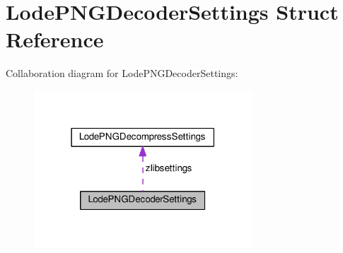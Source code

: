 \hypertarget{struct_lode_p_n_g_decoder_settings}{}\section{Lode\+P\+N\+G\+Decoder\+Settings Struct Reference}
\label{struct_lode_p_n_g_decoder_settings}


Collaboration diagram for Lode\+P\+N\+G\+Decoder\+Settings\+:
\nopagebreak
\begin{figure}[H]
\begin{center}
\leavevmode
\includegraphics[width=231pt]{struct_lode_p_n_g_decoder_settings__coll__graph}
\end{center}
\end{figure}
